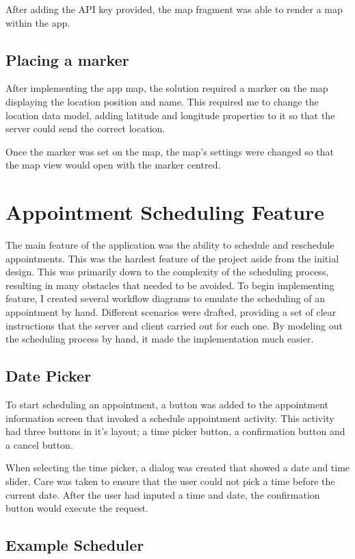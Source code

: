 After adding the API key provided, the map fragment was able to render a map within the app.

\subsection{Placing a marker}

After implementing the app map, the solution required a marker on the map displaying the location position and name. This required me to change the location data model, adding latitude and longitude properties to it so that the server could send the correct location.

Once the marker was set on the map, the map's settings were changed so that the map view would open with the marker centred.

\section{Appointment Scheduling Feature}

The main feature of the application was the ability to schedule and reschedule appointments. This was the hardest feature of the project aside from the initial design. This was primarily down to the complexity of the scheduling process, resulting in many obstacles that needed to be avoided. To begin implementing feature, I created several workflow diagrams to emulate the scheduling of an appointment by hand. Different scenarios were drafted, providing a set of clear instructions that the server and client carried out for each one. By modeling out the scheduling process by hand, it made the implementation much easier.

\subsection{Date Picker}

To start scheduling an appointment, a button was added to the appointment information screen that invoked a schedule appointment activity. This activity had three buttons in it's layout; a time picker button, a confirmation button and a cancel button.

When selecting the time picker, a dialog was created that showed a date and time slider. Care was taken to ensure that the user could not pick a time before the current date. After the user had inputed a time and date, the confirmation button would execute the request.

\subsection{Example Scheduler}


